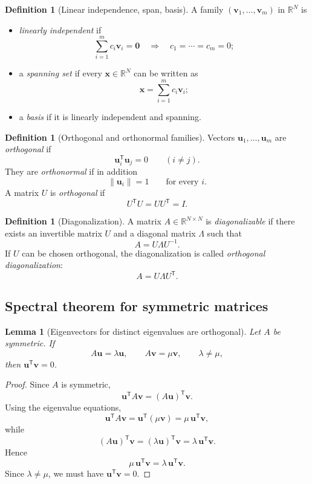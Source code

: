 \documentclass[11pt]{article}
\numberwithin{equation}{section}
\newtheorem{lemma}[theorem]{Lemma}
\theoremstyle{definition}
\newtheorem{definition}[theorem]{Definition}
\theoremstyle{remark}
\newcommand{\R}{\mathbb{R}}
\newcommand{\Id}{I}
\newcommand{\trans}{\mathsf{T}}
\newcommand{\norm}[1]{\lVert #1\rVert}
\begin{document}
\begin{definition}[Linear independence, span, basis]
A family $(\mathbf v_1,\dots,\mathbf v_m)$ in $\R^N$ is
\begin{itemize}[leftmargin=1.0cm]
\item \emph{linearly independent} if
\[
\sum_{i=1}^m c_i\mathbf v_i=\mathbf 0
\quad\Longrightarrow\quad
c_1=\cdots=c_m=0;
\]
\item a \emph{spanning set} if every $\mathbf x\in\R^N$ can be written as
\[
\mathbf x=\sum_{i=1}^m c_i\mathbf v_i;
\]
\item a \emph{basis} if it is linearly independent and spanning.
\end{itemize}
\end{definition}

\begin{definition}[Orthogonal and orthonormal families]
Vectors $\mathbf u_1,\dots,\mathbf u_m$ are \emph{orthogonal} if
\[
\mathbf u_i^\trans \mathbf u_j = 0 \qquad (i\neq j).
\]
They are \emph{orthonormal} if in addition
\[
\norm{\mathbf u_i}=1 \qquad \text{for every }i.
\]
A matrix $U$ is \emph{orthogonal} if
\[
U^\trans U=UU^\trans=\Id.
\]
\end{definition}

\begin{definition}[Diagonalization]
A matrix $A\in\R^{N\times N}$ is \emph{diagonalizable} if there exists an invertible matrix $U$ and a diagonal matrix $\Lambda$ such that
\[
A=U\Lambda U^{-1}.
\]
If $U$ can be chosen orthogonal, the diagonalization is called \emph{orthogonal diagonalization}:
\[
A=U\Lambda U^\trans.
\]
\end{definition}

\subsection{Spectral theorem for symmetric matrices}

\begin{lemma}[Eigenvectors for distinct eigenvalues are orthogonal]\label{lem:orthogonal_eigs}
Let $A$ be symmetric. If
\[
A\mathbf u=\lambda\mathbf u,\qquad A\mathbf v=\mu\mathbf v,
\qquad \lambda\neq \mu,
\]
then $\mathbf u^\trans\mathbf v=0$.
\end{lemma}

\begin{proof}
Since $A$ is symmetric,
\[
\mathbf u^\trans A\mathbf v=(A\mathbf u)^\trans \mathbf v.
\]
Using the eigenvalue equations,
\[
\mathbf u^\trans A\mathbf v = \mathbf u^\trans(\mu\mathbf v)=\mu\,\mathbf u^\trans\mathbf v,
\]
while
\[
(A\mathbf u)^\trans\mathbf v=(\lambda\mathbf u)^\trans\mathbf v=\lambda\,\mathbf u^\trans\mathbf v.
\]
Hence
\[
\mu\,\mathbf u^\trans\mathbf v=\lambda\,\mathbf u^\trans\mathbf v.
\]
Since $\lambda\neq \mu$, we must have $\mathbf u^\trans\mathbf v=0$.
\end{proof}
\end{document}
